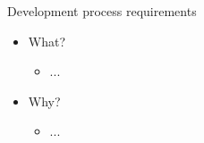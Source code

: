 \begin{Slide}{Development process requirements}
\begin{itemize}
\item What?
\begin{itemize}
\item ...
\end{itemize}
\item Why?
\begin{itemize}
\item ...

\end{itemize}
\end{itemize}
\end{Slide}